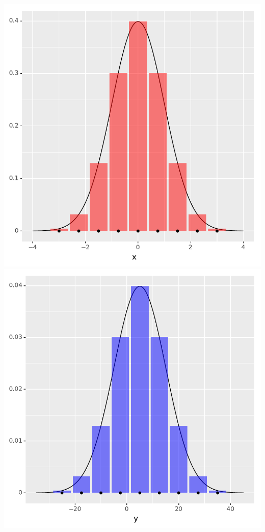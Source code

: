 \documentclass[landscape,footrule]{foils}
\begin{document}

\centerline{
\includegraphics[scale=0.5]{1d_source_distribution}\hspace*{1cm}
\includegraphics[scale=0.5]{1d_target_distribution}}
\end{document}
